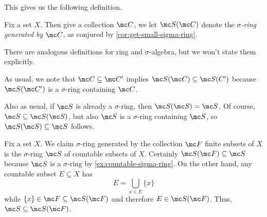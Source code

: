 \documentclass[../notes.tex]{subfiles}
\begin{document}
This gives us the following definition.
\begin{defihelper} 
	Fix a set $X$. Then give a collection $\mc C$, we let $\mc S(\mc C)$ denote the \textit{$\sigma$-ring generated by $\mc C$}, as conjured by \autoref{cor:get-small-sigma-ring}.
\end{defihelper}
There are analogous definitions for ring and $\sigma$-algebra, but we won't state them explicitly.
\begin{remark}
	As usual, we note that $\mc C\subseteq\mc C'$ implies $\mc S(\mc C)\subseteq\mc S(C')$ because $\mc S(\mc C')$ is a $\sigma$-ring containing $\mc C$.
\end{remark}
\begin{remark}
	Also as usual, if $\mc S$ is already a $\sigma$-ring, then $\mc S(\mc S)=\mc S$. Of course, $\mc S\subseteq\mc S(\mc S)$, but also $\mc S$ is a $\sigma$-ring containing $\mc S$, so $\mc S(\mc S)\subseteq\mc S$ follows.
\end{remark}
\begin{example}
	Fix a set $X$. We claim $\sigma$-ring generated by the collection $\mc F$ finite subsets of $X$ is the $\sigma$-ring $\mc S$ of countable subsets of $X$. Certainly $\mc S(\mc F)\subseteq\mc S$ because $\mc S$ is a $\sigma$-ring by \autoref{ex:countable-sigma-ring}. On the other hand, any countable subset $E\subseteq X$ has
	\[E=\bigcup_{x\in E}\{x\}\]
	while $\{x\}\in\mc F\subseteq\mc S(\mc F)$ and therefore $E\in\mc S(\mc F)$. Thus, $\mc S\subseteq\mc S(\mc F)$.
\end{example}
\end{document}
